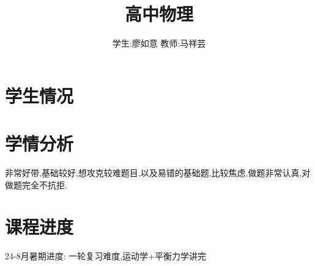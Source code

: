\documentclass{article}
\title{高中物理}
\author{学生:\quad 廖如意 \quad 教师:\quad 马祥芸}
\begin{document}
    \maketitle
    \tableofcontents
    \newpage

    \section{学生情况}
    \begin{center}
    \end{center}
        
    \section{学情分析}

    非常好带,基础较好,想攻克较难题目,以及易错的基础题,比较焦虑,做题非常认真,对做题完全不抗拒.

    \section{课程进度}

    24-8月暑期进度: 一轮复习难度,运动学+平衡力学讲完
\end{document}
